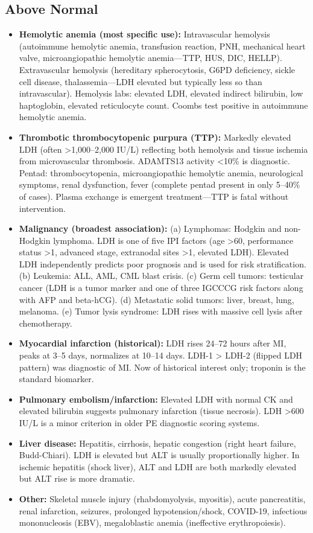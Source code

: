 \subsection*{Above Normal}
\begin{itemize}
  \item \textbf{Hemolytic anemia (most specific use):} Intravascular hemolysis (autoimmune hemolytic anemia, transfusion reaction, PNH, mechanical heart valve, microangiopathic hemolytic anemia---TTP, HUS, DIC, HELLP). Extravascular hemolysis (hereditary spherocytosis, G6PD deficiency, sickle cell disease, thalassemia---LDH elevated but typically less so than intravascular). Hemolysis labs: elevated LDH, elevated indirect bilirubin, low haptoglobin, elevated reticulocyte count. Coombs test positive in autoimmune hemolytic anemia.
  \item \textbf{Thrombotic thrombocytopenic purpura (TTP):} Markedly elevated LDH (often >1,000--2,000 IU/L) reflecting both hemolysis and tissue ischemia from microvascular thrombosis. ADAMTS13 activity <10\% is diagnostic. Pentad: thrombocytopenia, microangiopathic hemolytic anemia, neurological symptoms, renal dysfunction, fever (complete pentad present in only 5--40\% of cases). Plasma exchange is emergent treatment---TTP is fatal without intervention.
  \item \textbf{Malignancy (broadest association):} (a) Lymphomas: Hodgkin and non-Hodgkin lymphoma. LDH is one of five IPI factors (age >60, performance status >1, advanced stage, extranodal sites >1, elevated LDH). Elevated LDH independently predicts poor prognosis and is used for risk stratification. (b) Leukemia: ALL, AML, CML blast crisis. (c) Germ cell tumors: testicular cancer (LDH is a tumor marker and one of three IGCCCG risk factors along with AFP and beta-hCG). (d) Metastatic solid tumors: liver, breast, lung, melanoma. (e) Tumor lysis syndrome: LDH rises with massive cell lysis after chemotherapy.
  \item \textbf{Myocardial infarction (historical):} LDH rises 24--72 hours after MI, peaks at 3--5 days, normalizes at 10--14 days. LDH-1 > LDH-2 (flipped LDH pattern) was diagnostic of MI. Now of historical interest only; troponin is the standard biomarker.
  \item \textbf{Pulmonary embolism/infarction:} Elevated LDH with normal CK and elevated bilirubin suggests pulmonary infarction (tissue necrosis). LDH >600 IU/L is a minor criterion in older PE diagnostic scoring systems.
  \item \textbf{Liver disease:} Hepatitis, cirrhosis, hepatic congestion (right heart failure, Budd-Chiari). LDH is elevated but ALT is usually proportionally higher. In ischemic hepatitis (shock liver), ALT and LDH are both markedly elevated but ALT rise is more dramatic.
  \item \textbf{Other:} Skeletal muscle injury (rhabdomyolysis, myositis), acute pancreatitis, renal infarction, seizures, prolonged hypotension/shock, COVID-19, infectious mononucleosis (EBV), megaloblastic anemia (ineffective erythropoiesis).
\end{itemize}


